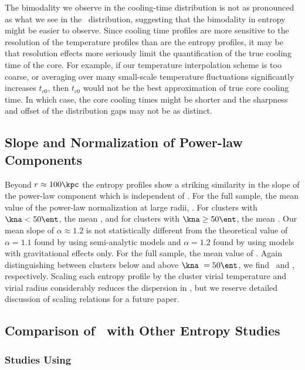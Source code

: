 The bimodality we observe in the cooling-time distribution is not as
pronounced as what we see in the \kna\ distribution, suggesting that
the bimodality in entropy might be easier to observe. Since cooling
time profiles are more sensitive to the resolution of the temperature
profiles than are the entropy profiles, it may be that resolution
effects more seriously limit the quantification of the true cooling
time of the core. For example, if our temperature interpolation scheme
is too coarse, or averaging over many small-scale temperature
fluctuations significantly increases $t_{c0}$, then $t_{c0}$ would not
be the best approximation of true core cooling time. In which case,
the core cooling times might be shorter and the sharpness and offset
of the distribution gaps may not be as distinct.

\subsection{Slope and Normalization of Power-law Components}
\label{sec:entsuppslopes}

Beyond $r \approx 100 \kpc$ the entropy profiles show a striking
similarity in the slope of the power-law component which is
independent of \kna. For the full sample, the mean value of the
power-law normalization at large radii, \alphafs. For clusters with
$\kna < 50 \ent$, the mean \alphaga, and for clusters with $\kna \geq
50 \ent$, the mean \alphagb. Our mean slope of $\alpha \approx 1.2$ is
not statistically different from the theoretical value of $\alpha =
1.1$ found by \citet{tozzi01} using semi-analytic models and $\alpha =
1.2$ found by \citet{vkb05} using models with gravitational effects
only. For the full sample, the mean value of \khunfs. Again
distinguishing between clusters below and above $\kna\ = 50 \ent$, we
find \khunga\ and \khungb, respectively. Scaling each entropy profile
by the cluster virial temperature and virial radius considerably
reduces the dispersion in \khun, but we reserve detailed discussion of
scaling relations for a future paper.

\subsection{Comparison of \accept\ with Other Entropy Studies}
\label{sec:entsuppcomp}

\subsubsection{Studies Using \xmm}

